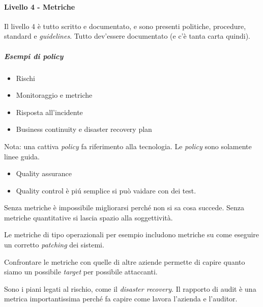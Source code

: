 \paragraph{Livello 4 - Metriche}


Il livello 4 è tutto scritto e documentato, e sono presenti politiche, 
procedure, standard e \textit{guidelines}. Tutto dev'essere documentato (e c'è 
tanta carta quindi).



\subparagraph{Esempi di policy}

\begin{itemize}
\item Rischi
\item Monitoraggio e metriche
\item Risposta all'incidente
\item Business continuity e disaster recovery plan
\end{itemize}

Nota: una cattiva \textit{policy} fa riferimento alla tecnologia. Le 
\textit{policy} sono solamente linee guida.


\begin{itemize}
\item Quality assurance 
\item Quality control è piú semplice si può vaidare con dei test.
\end{itemize}






Senza metriche è impossibile migliorarsi perché non si sa cosa succede.
Senza metriche quantitative si lascia spazio alla soggettività.


Le metriche di tipo operazionali per esempio includono metriche su come eseguire 
un corretto \textit{patching} dei sistemi.


Confrontare le metriche con quelle di altre aziende permette di capire quanto 
siamo un possibile \textit{target} per possibile attaccanti.


Sono i piani legati al rischio, come il \textit{disaster recovery}.
Il rapporto di audit è una metrica importantissima perché fa capire come lavora 
l'azienda e l'auditor.

